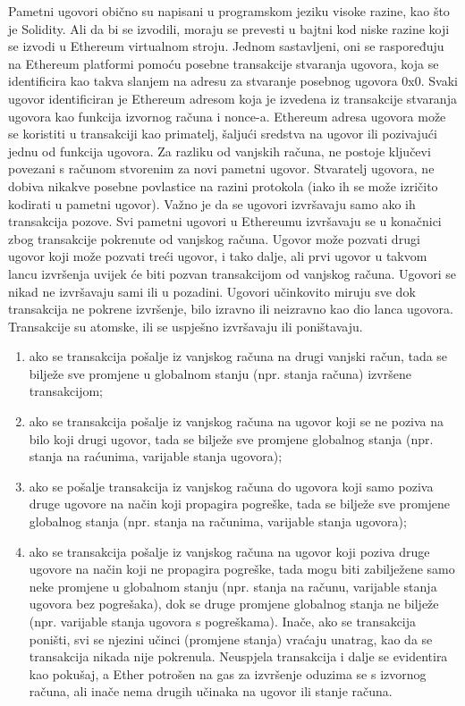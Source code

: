 \documentclass[times, utf8, diplomski]{fer}
\begin{document}
Pametni ugovori obično su napisani u programskom jeziku visoke razine, kao što je Solidity. Ali da bi se izvodili, moraju se prevesti u bajtni kod niske razine koji se izvodi u Ethereum virtualnom stroju. Jednom sastavljeni, oni se raspoređuju na Ethereum platformi pomoću posebne transakcije stvaranja ugovora, koja se identificira kao takva slanjem na adresu za stvaranje posebnog ugovora 0x0. Svaki ugovor identificiran je Ethereum adresom koja je izvedena iz transakcije stvaranja ugovora kao funkcija izvornog računa i nonce-a. Ethereum adresa ugovora može se koristiti u transakciji kao primatelj, šaljući sredstva na ugovor ili pozivajući jednu od funkcija ugovora. Za razliku od vanjskih računa, ne postoje ključevi povezani s računom stvorenim za novi
pametni ugovor. Stvaratelj ugovora, ne dobiva nikakve posebne povlastice na razini protokola (iako ih se može izričito kodirati u pametni ugovor).
Važno je da se ugovori izvršavaju samo ako ih transakcija pozove. Svi pametni ugovori u Ethereumu izvršavaju se u konačnici zbog transakcije pokrenute od vanjskog računa. Ugovor može pozvati drugi ugovor koji može pozvati treći ugovor, i tako dalje, ali prvi ugovor u takvom lancu izvršenja uvijek će biti pozvan transakcijom od vanjskog računa. Ugovori se nikad ne izvršavaju sami ili u pozadini. Ugovori učinkovito miruju sve dok transakcija ne pokrene izvršenje, bilo izravno ili neizravno kao dio lanca ugovora.  Transakcije su atomske,  ili se uspješno izvršavaju ili poništavaju.

\begin{enumerate}

\item ako se transakcija pošalje iz vanjskog računa na drugi vanjski račun, tada se bilježe sve promjene u globalnom stanju (npr. stanja računa) izvršene transakcijom;

\item ako se transakcija pošalje iz vanjskog računa na ugovor koji se ne poziva na bilo koji drugi ugovor, tada se bilježe sve promjene globalnog stanja (npr. stanja na raćunima, varijable stanja ugovora);

\item ako se pošalje transakcija iz vanjskog računa do ugovora koji samo poziva druge ugovore na način koji propagira pogreške, tada se bilježe sve promjene globalnog stanja (npr. stanja na računima, varijable stanja ugovora);

\item ako se transakcija pošalje iz vanjskog računa na ugovor koji poziva druge ugovore na način koji ne propagira pogreške, tada mogu biti zabilježene samo neke promjene u globalnom stanju (npr. stanja na računu, varijable stanja ugovora bez pogrešaka), dok se druge promjene globalnog stanja ne bilježe (npr. varijable stanja ugovora s pogreškama). Inače, ako se transakcija poništi, svi se njezini učinci (promjene stanja) vraćaju unatrag, kao da se transakcija nikada nije pokrenula. Neuspjela transakcija i dalje se evidentira kao pokušaj, a Ether potrošen na gas za izvršenje oduzima se s izvornog računa, ali inače nema drugih učinaka na ugovor ili stanje računa.

\end{enumerate}
\end{document}
